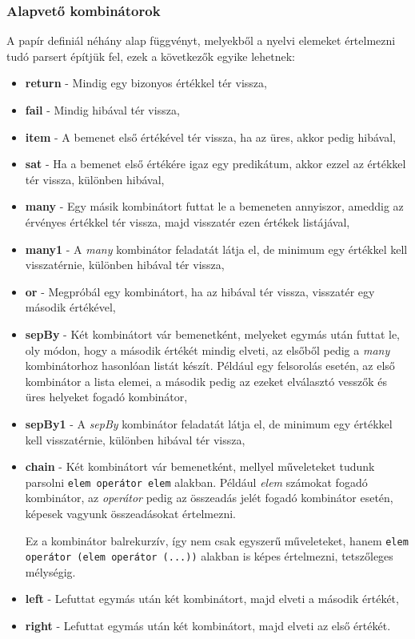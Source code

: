\subsubsection{Alapvető kombinátorok}

A papír definiál néhány alap függvényt, melyekből a nyelvi elemeket értelmezni tudó parsert építjük fel, ezek a következők egyike lehetnek:

\begin{itemize}
    \item \textbf{return} - Mindig egy bizonyos értékkel tér vissza,
    \item \textbf{fail} - Mindig hibával tér vissza,
    \item \textbf{item} - A bemenet első értékével tér vissza, ha az üres, akkor pedig hibával,
    \item \textbf{sat} - Ha a bemenet első értékére igaz egy predikátum, akkor ezzel az értékkel tér vissza, különben hibával,
    \item \textbf{many} - Egy másik kombinátort futtat le a bemeneten annyiszor, ameddig az érvényes értékkel tér vissza, majd visszatér ezen értékek listájával,
    \item \textbf{many1} - A \textit{many} kombinátor feladatát látja el, de minimum egy értékkel kell visszatérnie, különben hibával tér vissza,
    \item \textbf{or} - Megpróbál egy kombinátort, ha az hibával tér vissza, visszatér egy második értékével,
    \item \textbf{sepBy} - Két kombinátort vár bemenetként, melyeket egymás után futtat le, oly módon, hogy a második értékét mindig elveti, az elsőből pedig a \textit{many} kombinátorhoz hasonlóan listát készít. Például egy felsorolás esetén, az első kombinátor a lista elemei, a második pedig az ezeket elválasztó vesszők és üres helyeket fogadó kombinátor,
    \item \textbf{sepBy1} - A \textit{sepBy} kombinátor feladatát látja el, de minimum egy értékkel kell visszatérnie, különben hibával tér vissza,
    \item \textbf{chain} - Két kombinátort vár bemenetként, mellyel műveleteket tudunk parsolni \verb_elem operátor elem_ alakban. Például \textit{elem} számokat fogadó kombinátor, az \textit{operátor} pedig az összeadás jelét fogadó kombinátor esetén, képesek vagyunk összeadásokat értelmezni.
    
    Ez a kombinátor balrekurzív, így nem csak egyszerű műveleteket, hanem \texttt{elem operátor (elem operátor (...))} alakban is képes értelmezni, tetszőleges mélységig.
    \item \textbf{left} - Lefuttat egymás után két kombinátort, majd elveti a második értékét,
    \item \textbf{right} - Lefuttat egymás után két kombinátort, majd elveti az első értékét.
\end{itemize}

